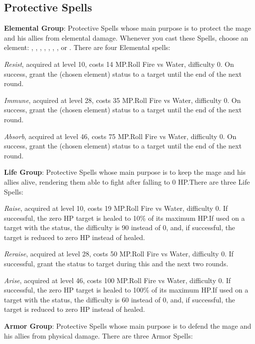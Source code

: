 \begin{multicols}{2}
    \subsection{Protective Spells}\label{subsec:white-protective}

    \textbf{Elemental Group}: Protective Spells whose main purpose is to protect the mage and his allies from elemental damage. Whenever you cast these Spells, choose an element: , , , , , , ,  or . There are four Elemental spells:

    \textit{Resist}, acquired at level 10, costs 14 MP.\@{}Roll Fire vs Water, difficulty 0. On success, grant the  (chosen element) status to a target until the end of the next round.

    \textit{Immune}, acquired at level 28, costs 35 MP.\@{}Roll Fire vs Water, difficulty 0. On success, grant the  (chosen element) status to a target until the end of the next round.

    \textit{Absorb}, acquired at level 46, costs 75 MP.\@{}Roll Fire vs Water, difficulty 0. On success, grant the  (chosen element) status to a target until the end of the next round.

    \textbf{Life Group}: Protective Spells whose main purpose is to keep the mage and his allies alive, rendering them able to fight after falling to 0 HP.\@{}There are three Life Spells:

    \textit{Raise}, acquired at level 10, costs 19 MP.\@{}Roll Fire vs Water, difficulty 0. If successful, the zero HP target is healed to 10\% of its maximum HP.\@{}If used on a target with the  status, the difficulty is 90 instead of 0, and, if successful, the target is reduced to zero HP instead of healed.

    \textit{Reraise}, acquired at level 28, costs 50 MP.\@{}Roll Fire vs Water, difficulty 0. If successful, grant the  status to target during this and the next two rounds.

    \textit{Arise}, acquired at level 46, costs 100 MP.\@{}Roll Fire vs Water, difficulty 0. If successful, the zero HP target is healed to 100\% of its maximum HP.\@{}If used on a target with the  status, the difficulty is 60 instead of 0, and, if successful, the target is reduced to zero HP instead of healed.

    \textbf{Armor Group}: Protective Spells whose main purpose is to defend the mage and his allies from physical damage. There are three Armor Spells:


\end{multicols}
